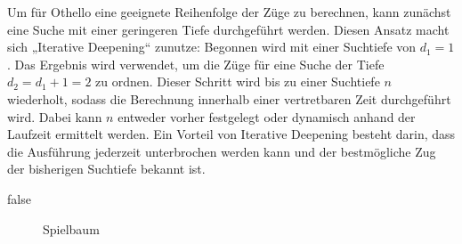 Um für Othello eine geeignete Reihenfolge der Züge zu berechnen, kann zunächst eine Suche mit einer geringeren Tiefe
durchgeführt werden. Diesen Ansatz macht sich „Iterative Deepening“ zunutze: Begonnen wird mit einer Suchtiefe von
$d_1=1$. Das Ergebnis wird verwendet, um die Züge für eine Suche der Tiefe $d_2=d_1+1=2$ zu ordnen. Dieser Schritt wird
bis zu einer Suchtiefe $n$ wiederholt, sodass die Berechnung innerhalb einer vertretbaren Zeit durchgeführt wird. Dabei
kann $n$ entweder vorher festgelegt oder dynamisch anhand der Laufzeit ermittelt werden. Ein Vorteil von Iterative
Deepening besteht darin, dass die Ausführung jederzeit unterbrochen werden kann und der bestmögliche Zug der bisherigen
Suchtiefe bekannt ist.
\cite[S.~4]{alphabetaefficiency}

\ifx false
\begin{figure}[]
    \centering
    \caption{Spielbaum}
    \label{fig:game_tree}
\end{figure}
\fi
